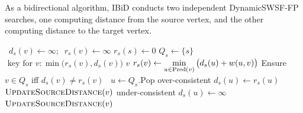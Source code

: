 \documentclass[nobib]{tufte-book}
\begin{document}
{
\begin{algorithm}[t]
   \caption{As a bidirectional algorithm,
      IBiD conducts two independent DynamicSWSF-FP searches,
      one computing distance from the source vertex,
      and the other computing distance to the target vertex.}
   \label{alg:ibid-two-dynamicswsffps}
   \begin{minipage}[t]{8.2cm}
      \begin{algorithmic}[1]
          {\,\!}
               \State $d_s(v) \gets \infty; \;\; r_s(v) \gets \infty$
            \EndFor
            \State $r_s(s) \gets 0$
            \State $Q_s \gets \{ s \}$
               \Comment $\mbox{ key for } v: \min\big(r_s(v),d_s(v)\big)$
         \EndProcedure
          {$v$}
               \State $r_s(v) \gets \displaystyle\min_{u \in \mbox{\scriptsize Pred}(v)}
                  \big( d_s(u) + w(u,v) \big)$
            \EndIf
            \State Ensure $v \in Q_s$ iff $d_s(v) \neq r_s(v)$
         \EndProcedure
          {\,\!}
            \State $u \gets Q_s.\mbox{Pop}$
                  \Comment over-consistent
               \State $d_s(u) \gets r_s(u)$
                  \State $\mbox{\sc UpdateSourceDistance}(v)$
               \EndFor
            \Else
                  \Comment under-consistent
               \State $d_s(u) \gets \infty$
                  \State $\mbox{\sc UpdateSourceDistance}(v)$
               \EndFor
            \EndIf
         \EndProcedure
      \end{algorithmic}
   \end{minipage}
   \quad
   \begin{minipage}[t]{8.2cm}
\end{minipage}
\end{algorithm}}
\end{document}
